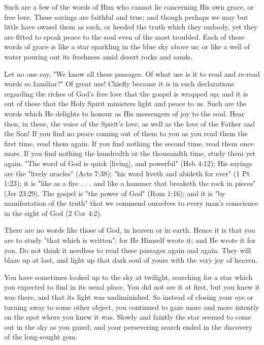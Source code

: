 \documentclass[
]{book}
\begin{document}
Such are a few of the words of Him who cannot lie concerning His own grace, or free love. These sayings are faithful and true; and though perhaps we may but little have owned them as such, or heeded the truth which they embody, yet they are fitted to speak peace to the soul even of the most troubled. Each of these words of grace is like a star sparkling in the blue sky above us; or like a well of water pouring out its freshness amid desert rocks and sands.

Let no one say, "We know all these passages. Of what use is it to read and re-read words so familiar?" Of great use! Chiefly because it is in such declarations regarding the riches of God's free love that the gospel is wrapped up; and it is out of these that the Holy Spirit ministers light and peace to us. Such are the words which He delights to honour as His messengers of joy to the soul. Hear then, in these, the voice of the Spirit's love, as well as the love of the Father and the Son! If you find no peace coming out of them to you as you read them the first time, read them again. If you find nothing the second time, read them once more. If you find nothing the hundredth or the thousandth time, study them yet again. "The word of God is quick {[}living{]}, and powerful" (Heb 4:12); His sayings are the "lively oracles" (Acts 7:38); "his word liveth and abideth for ever" (1 Pt 1:23); it is "like as a fire . . . and like a hammer that breaketh the rock in pieces" (Jer 23:29). The gospel is "the power of God" (Rom 1:16); and it is "by manifestation of the truth" that we commend ourselves to every man's conscience in the sight of God (2 Cor 4:2).

There are no words like those of God, in heaven or in earth. Hence it is that you are to study "that which is written"; for He Himself wrote it; and He wrote it for you. Do not think it needless to read these passages again and again. They will blaze up at last, and light up that dark soul of yours with the very joy of heaven.

You have sometimes looked up to the sky at twilight, searching for a star which you expected to find in its usual place. You did not see it at first, but you knew it was there, and that its light was undiminished. So instead of closing your eye or turning away to some other object, you continued to gaze more and more intently on the spot where you knew it was. Slowly and faintly the star seemed to come out in the sky as you gazed; and your persevering search ended in the discovery of the long-sought gem.
\end{document}
